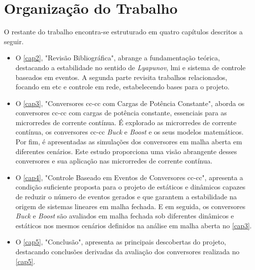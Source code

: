 \section{Organização do Trabalho}

O restante do trabalho encontra-se estruturado em quatro capítulos descritos a seguir.


\begin{itemize}
    \item O \autoref{cap2}, "Revisão Bibliográfica", abrange a fundamentação teórica, destacando a estabilidade no sentido de \textit{Lyapunov}, \acrfull{lmi} e sistema de controle baseados em eventos. A segunda parte revisita trabalhos relacionados, focando em \acrshort{etc} e controle em rede, estabelecendo bases para o projeto.
    \item O \autoref{cap3}, "Conversores \acrshort{cc}-\acrshort{cc} com Cargas de Potência Constante", aborda os conversores \acrshort{cc}-\acrshort{cc} com cargas de potência constante, essenciais para as microrredes de corrente contínua. É explorado as microrredes de corrente contínua, os conversores \acrshort{cc}-\acrshort{cc} \textit{Buck} e \textit{Boost} e os seus modelos matemáticos. Por fim, é apresentadas as simulações dos conversores em malha aberta em diferentes cenários. Este estudo proporciona uma visão abrangente desses conversores e sua aplicação nas microrredes de corrente contínua.
    \item O \autoref{cap4}, "Controle Baseado em Eventos de Conversores \acrshort{cc}-\acrshort{cc}", apresenta a condição suficiente proposta para o projeto de  estáticos e dinâmicos capazes de reduzir o número de eventos gerados e que garantem a estabilidade na origem de sistemas lineares em malha fechada. E em seguida, os conversores \textit{Buck} e \textit{Boost} são avaliados em malha fechada sob diferentes  dinâmicos e estáticos nos mesmos cenários definidos na análise em malha aberta no \autoref{cap3}.  
    \item O \autoref{cap5}, "Conclusão", apresenta as principais descobertas do projeto, destacando conclusões derivadas da avaliação dos conversores realizada no \autoref{cap5}.
\end{itemize}



